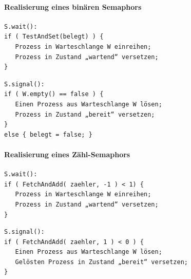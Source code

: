 \documentclass[11pt]{article}
\begin{document}
\paragraph*{Realisierung eines binären Semaphors}
\label{sec:orgd0d1363}
\begin{verbatim}
S.wait():
if ( TestAndSet(belegt) ) {
   Prozess in Warteschlange W einreihen; 
   Prozess in Zustand „wartend“ versetzen;
}
\end{verbatim}
\begin{verbatim}
S.signal():
if ( W.empty() == false ) {
   Einen Prozess aus Warteschlange W lösen; 
   Prozess in Zustand „bereit“ versetzen;
}
else { belegt = false; }
\end{verbatim}
\paragraph*{Realisierung eines Zähl-Semaphors}
\label{sec:org38b9bf2}
\begin{verbatim}
S.wait():
if ( FetchAndAdd( zaehler, -1 ) < 1) {
   Prozess in Warteschlange W einreihen; 
   Prozess in Zustand „wartend“ versetzen;
}
\end{verbatim}
\begin{verbatim}
S.signal():
if ( FetchAndAdd( zaehler, 1 ) < 0 ) {
   Einen Prozess aus Warteschlange W lösen; 
   Gelösten Prozess in Zustand „bereit“ versetzen;
}
\end{verbatim}
\end{document}
